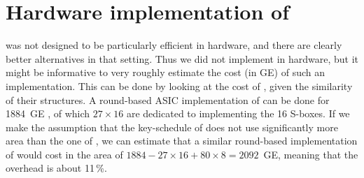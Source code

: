 \section{Hardware implementation of \fly}
\label{implem:hw}
\fly was not designed to be particularly efficient in hardware, and there are clearly better alternatives in that setting. Thus we did not implement \fly in hardware, but it might be informative to very roughly estimate the cost (in GE) of such
an implementation. This can be done by looking at the cost of \present, given the similarity of their structures.
A round-based ASIC implementation of  can be done for 1884~GE \cite{poschmann}, of which $27\times16$ are dedicated to implementing the 16 S-boxes. If we make the assumption that the key-schedule of \fly does not use significantly more area
than the one of , we can estimate that a similar round-based implementation of \fly would cost in the area of $1884 - 27\times16 + 80\times8 = 2092$~GE, meaning that the overhead is about
11\,\%.
